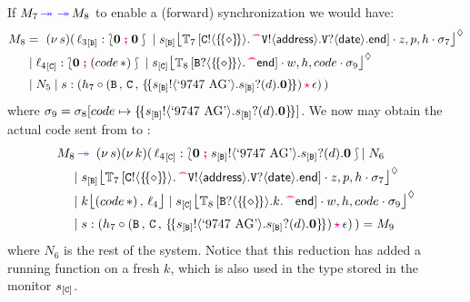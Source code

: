 \documentclass[runningheads,plain]{llncs}
\begin{document}
If $M_7 \textcolor{blue}{\,\twoheadrightarrow\,} \textcolor{blue}{\,\twoheadrightarrow\,} M_8$ to enable a (forward) synchronization 
we would have:
\begin{align*}
M_8 & = ~   \news{s}(\,  \np{\key{{\loc_3}}{\pB}}{ \conf{\inact}{\inact}} 
\Par \hmoni{\ep{s}{\pB}}{\myctxr{\ctx{T}_7}{\ltout{C}{\thunkt}{\past\ltout{\pS}{\mathsf{address}}{\ltinp{\pS}{\mathsf{date}}{\lend}}}}}{z,p,h}{\store_7} 
\\
& \Par \np{\key{{\loc_4}}{\pC}}{ \conf{\inact}{(\appl{code}{\dummyn}) }} 
 \Par 
\hmoni{\ep{s}{\pC}}{\myctxr{\ctx{T}_8}{ \ltinp{B}{\thunkt}{\past\lend}}}{w,h,code}{\store_9} 
\\
& 
\Par N_5 \Par \codah{s}{h_7 \cons \valueq{\pB}{\pC}{\thunkp{\bout{\epB}{\text{`9747 AG'}}\binp{\epB}{d}\inact}}}{\emp}{}~) 
\end{align*}
where
$\sigma_9 = \sigma_8 [code\mapsto \{\!\{s_{[\mathtt{B}]} ! \langle \text{`9747 AG'} \rangle .s_{[\mathtt{B}]} ? (d) .\mathbf{0}\}\!\}]$.
We now may 
obtain the actual code sent from \pB to \pC:
\begin{align*}
M_8 & \fw ~   \news{s}\news{k}(\,  
\np{\key{{\loc_4}}{\pC}}{\conf{\inact}{\bout{\epB}{\text{`9747 AG'}}\binp{\epB}{d}\inact}} 
\!\!  \Par N_6 
\\
& \!\!\Par \hmoni{\ep{s}{\pB}}{\myctxr{\ctx{T}_7}{\ltout{C}{\thunkt}{\past\ltout{\pS}{\mathsf{address}}{\ltinp{\pS}{\mathsf{date}}{\lend}}}}}{z,p,h}{\store_7} 
\\
& \!\!\Par 
\mem{k}{(\appl{code}{\dummyn})}{{\loc_4}} 
\Par 
\hmoni{\ep{s}{\pC}}{\myctxr{\ctx{T}_8}{ \ltinp{B}{\thunkt}{k.\past\lend}}}{w,h,code}{\store_9} 
\\
& 
\!\!\Par \codah{s}{h_7 \cons \valueq{\pB}{\pC}{\thunkp{\bout{\epB}{\text{`9747 AG'}}\binp{\epB}{d}\inact}}}{\emp}{}~) 
= M_9
\end{align*}
where $N_6$ is the rest of the system. 
Notice that this reduction has added a running function on a fresh 
$k$, which is also used  in the type stored in the monitor $s_{[\mathtt{C}]}$.
\end{document}
